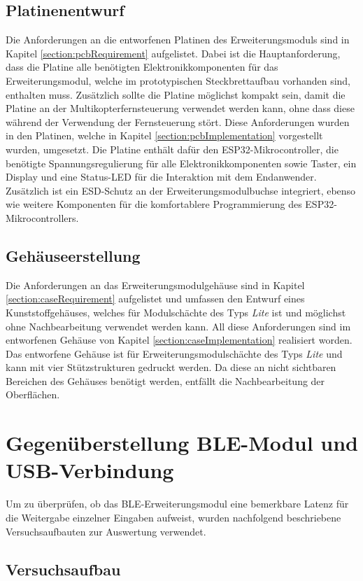 \subsection{Platinenentwurf}
Die Anforderungen an die entworfenen Platinen des Erweiterungsmoduls sind in Kapitel \ref{section:pcbRequirement} aufgelistet. Dabei ist die Hauptanforderung, dass die Platine alle benötigten Elektronikkomponenten für das Erweiterungsmodul, welche im prototypischen Steckbrettaufbau vorhanden sind, enthalten muss. Zusätzlich sollte die Platine möglichst kompakt sein, damit die Platine an der Multikopterfernsteuerung verwendet werden kann, ohne dass diese während der Verwendung der Fernsteuerung stört. Diese Anforderungen wurden in den Platinen, welche in Kapitel \ref{section:pcbImplementation} vorgestellt wurden, umgesetzt. Die Platine enthält dafür den ESP32-Mikrocontroller, die benötigte Spannungsregulierung für alle Elektronikkomponenten sowie Taster, ein Display und eine Status-\ac{LED} für die Interaktion mit dem Endanwender. Zusätzlich ist ein \ac{ESD}-Schutz an der Erweiterungsmodulbuchse integriert, ebenso wie weitere Komponenten für die komfortablere Programmierung des ESP32-Mikrocontrollers.

\subsection{Gehäuseerstellung}
Die Anforderungen an das Erweiterungsmodulgehäuse sind in Kapitel \ref{section:caseRequirement} aufgelistet und umfassen den Entwurf eines Kunststoffgehäuses, welches für Modulschächte des Typs \textit{Lite} ist und möglichst ohne Nachbearbeitung verwendet werden kann. All diese Anforderungen sind im entworfenen Gehäuse von Kapitel \ref{section:caseImplementation} realisiert worden. Das entworfene Gehäuse ist für Erweiterungsmodulschächte des Typs \textit{Lite} und kann mit vier Stützstrukturen gedruckt werden. Da diese an nicht sichtbaren Bereichen des Gehäuses benötigt werden, entfällt die Nachbearbeitung der Oberflächen.

\section{Gegenüberstellung \acs{BLE}-Modul und USB-Verbindung}
Um zu überprüfen, ob das \ac{BLE}-Erweiterungsmodul eine bemerkbare Latenz für die Weitergabe einzelner Eingaben aufweist, wurden nachfolgend beschriebene Versuchsaufbauten zur Auswertung verwendet.

\subsection{Versuchsaufbau}

